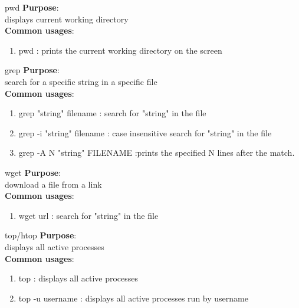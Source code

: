 \documentclass[11pt]{beamer}
\begin{document}
\begin{frame}{pwd}
\textbf{Purpose}:\\
\large displays current working directory\vspace{1cm}\pause \\
 
\textbf{Common usages}:\\
\begin{enumerate}
\item pwd : prints the current working directory on the screen
\end{enumerate}
\end{frame}

\begin{frame}{grep}
\textbf{Purpose}:\\
\large search for a specific string in a specific file\vspace{1cm}\pause \\
 
\textbf{Common usages}:\\
\begin{enumerate}
\item grep "string" filename : search for "string" in the file
\item grep -i "string" filename : case insensitive search for "string" in the file
\item grep -A N "string" FILENAME :prints the specified N lines after the match.
\end{enumerate}
\end{frame}

\begin{frame}{wget}
\textbf{Purpose}:\\
\large download a file from a link\vspace{1cm}\pause \\
 
\textbf{Common usages}:\\
\begin{enumerate}
\item wget url : search for "string" in the file
\end{enumerate}
\end{frame}

\begin{frame}{top/htop}
\textbf{Purpose}:\\
\large displays all active processes\vspace{1cm}\pause \\
 
\textbf{Common usages}:\\
\begin{enumerate}
\item top : displays all active processes
\item top -u username : displays all active processes run by username
\end{enumerate}
\end{frame}
\end{document}
